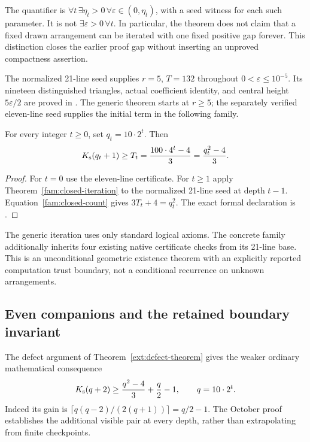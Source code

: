 The quantifier is $\forall t\,\exists\eta_t>0\,\forall\varepsilon
\in(0,\eta_t)$, with a seed witness for each such parameter. It is not
$\exists\varepsilon>0\,\forall t$. In particular, the theorem does not
claim that a fixed drawn arrangement can be iterated with one fixed
positive gap forever. This distinction closes the earlier proof gap
without inserting an unproved compactness assertion.

The normalized 21-line seed supplies $r=5$, $T=132$ throughout
$0<\varepsilon\le10^{-5}$. Its nineteen distinguished triangles, actual
coefficient identity, and central height $5\varepsilon/2$ are proved in
. The generic theorem starts at $r\ge5$;
the separately verified eleven-line seed supplies the initial term in
the following family.

\begin{theorem}\label{fam:odd-verified}
For every integer $t\ge0$, set $q_t=10\cdot2^t$. Then
\begin{equation}
 K_{\mathrm{s}}(q_t+1)\ge T_t=\frac{100\cdot4^t-4}{3}
                    =\frac{q_t^2-4}{3}.
 \label{fam:eleven-family}
\end{equation}
\end{theorem}
\begin{proof}
For $t=0$ use the eleven-line certificate. For $t\ge1$ apply
Theorem~\ref{fam:closed-iteration} to the normalized 21-line seed at depth
$t-1$. Equation~\eqref{fam:closed-count} gives $3T_t+4=q_t^2$.
The exact formal declaration is
.
\end{proof}

The generic iteration uses only standard logical axioms. The concrete
family additionally inherits four existing native certificate checks
from its 21-line base. This is an unconditional geometric existence
theorem with an explicitly reported computation trust boundary, not a
conditional recurrence on unknown arrangements.

\subsection{Even companions and the retained boundary invariant}

The defect argument of Theorem~\ref{ext:defect-theorem} gives the weaker
ordinary mathematical consequence
\begin{equation}
 K_{\mathrm{s}}(q+2)\ge\frac{q^2-4}{3}+\frac q2-1,
 \qquad q=10\cdot2^t.
 \label{fam:even-defect}
\end{equation}
Indeed its gain is
$\lceil q(q-2)/(2(q+1))\rceil=q/2-1$. The October proof establishes the
additional visible pair at every depth, rather than extrapolating from
finite checkpoints.

